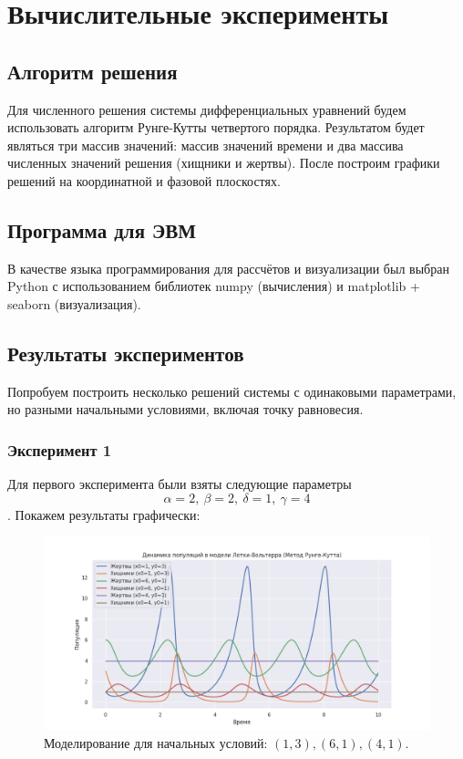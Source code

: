 \chapter{Вычислительные эксперименты}
\section{Алгоритм решения}

Для численного решения системы дифференциальных уравнений будем использовать алгоритм Рунге-Кутты \cite{1964calculus} четвертого порядка. Результатом будет являться три массив значений: массив значений времени и два массива численных значений решения (хищники и жертвы). После построим графики решений на координатной и фазовой плоскостях.

\section{Программа для ЭВМ}

В качестве языка программирования для рассчётов и визуализации был выбран Python с использованием библиотек numpy (вычисления) и matplotlib + seaborn (визуализация).

 

\section{Результаты экспериментов}
Попробуем построить несколько решений системы с одинаковыми параметрами, но разными начальными условиями, включая точку равновесия.
\subsection{Эксперимент 1}
Для первого эксперимента были взяты следующие параметры $$\alpha = 2, \ \beta = 2, \ \delta = 1, \ \gamma = 4$$.
Покажем результаты графически:
\begin{figure}[h]  %
	\centering
	\includegraphics[width=1\textwidth]{imgs/pop_1.png}  %
	\caption{Моделирование для начальных условий: $(1,3), (6,1),(4,1)$.}  %
	\label{fig:pop_1}  %
\end{figure}

